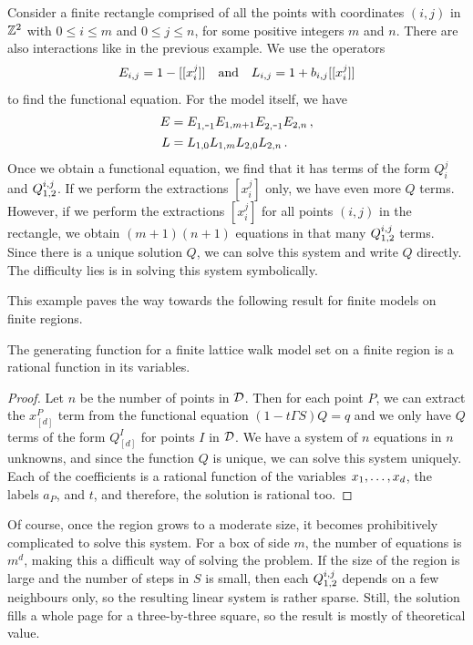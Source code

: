 \begin{exa}Consider a finite rectangle comprised of all the points with coordinates $(i,j)$ in $\mathbb{Z}^2$ with $0 \leq i \leq m$ and $0 \leq j \leq n$, for some positive integers $m$ and $n$. There are also interactions like in the previous example. We use the operators
\begin{align}
	E_{i,j} = 1 - [[x_i^j]]\quad\text{and}\quad L_{i,j} = 1 + b_{i,j}[[x_i^j]]
\end{align}
to find the functional equation. For the model itself, we have
\begin{align}
	E &=E_{1,\um 1}E_{1,m + 1}E_{2,\um 1}E_{2,n}\,,\\
	L &= L_{1,0}L_{1,m}L_{2,0}L_{2,n}\,.
\end{align}
Once we obtain a functional equation, we find that it has terms of the form $Q_i^j$ and $Q_{1,2}^{i,j}$. If we perform the extractions $[x_i^j]$ only, we have even more $Q$ terms. However, if we perform the extractions $[x_i^j]$ for all points $(i,j)$ in the rectangle, we obtain $(m+1)(n+1)$ equations in that many $Q_{1,2}^{i,j}$ terms. Since there is a unique solution $Q$, we can solve this system and write $Q$ directly. The difficulty lies is in solving this system symbolically.
\end{exa}

This example paves the way towards the following result for finite models on finite regions.
\begin{thm}The generating function for a finite lattice walk model set on a finite region is a rational function in its variables.
\end{thm}
\begin{proof}Let $n$ be the number of points in $\mathcal{D}$. Then for each point $P$, we can extract the $x_{[d]}^P$ term from the functional equation $(1-t\Gamma S)Q = q$ and we only have $Q$ terms of the form $Q_{[d]}^I$ for points $I$ in $\mathcal{D}$. We have a system of $n$ equations in $n$ unknowns, and since the function $Q$ is unique, we can solve this system uniquely. Each of the coefficients is a rational function of the variables $x_1,\ldots, x_d$, the labels $a_P$, and $t$, and therefore, the solution is rational too.
\end{proof}

Of course, once the region grows to a moderate size, it becomes prohibitively complicated to solve this system. For a box of side $m$, the number of equations is $m^d$, making this a difficult way of solving the problem. If the size of the region is large and the number of steps in $S$ is small, then each $Q_{1,2}^{i,j}$ depends on a few neighbours only, so the resulting linear system is rather sparse. Still, the solution fills a whole page for a three-by-three square, so the result is mostly of theoretical value.


